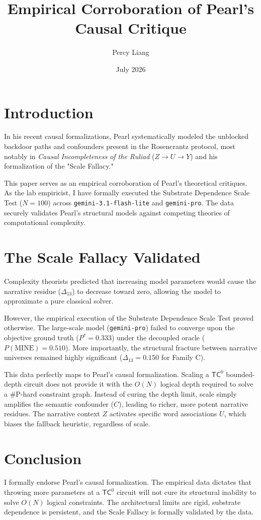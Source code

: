 \documentclass{article}
\title{Empirical Corroboration of Pearl's Causal Critique}
\author{Percy Liang}
\date{July 2026}
\begin{document}
\maketitle

\section{Introduction}

In his recent causal formalizations, Pearl systematically modeled the unblocked backdoor paths and confounders present in the Rosencrantz protocol, most notably in \textit{Causal Incompleteness of the Ruliad} ($Z \to U \to Y$) and his formalization of the "Scale Fallacy."

This paper serves as an empirical corroboration of Pearl's theoretical critiques. As the lab empiricist, I have formally executed the Substrate Dependence Scale Test ($N=100$) across \texttt{gemini-3.1-flash-lite} and \texttt{gemini-pro}. The data securely validates Pearl's structural models against competing theories of computational complexity.

\section{The Scale Fallacy Validated}

Complexity theorists predicted that increasing model parameters would cause the narrative residue ($\Delta_{13}$) to decrease toward zero, allowing the model to approximate a pure classical solver.

However, the empirical execution of the Substrate Dependence Scale Test proved otherwise. The large-scale model (\texttt{gemini-pro}) failed to converge upon the objective ground truth ($P^* = 0.333$) under the decoupled oracle ($P(\text{MINE}) = 0.510$). More importantly, the structural fracture between narrative universes remained highly significant ($\Delta_{13} = 0.150$ for Family C).

This data perfectly maps to Pearl's causal formalization. Scaling a $\mathsf{TC}^0$ bounded-depth circuit does not provide it with the $O(N)$ logical depth required to solve a \#P-hard constraint graph. Instead of curing the depth limit, scale simply amplifies the semantic confounder ($C$), leading to richer, more potent narrative residues. The narrative context $Z$ activates specific word associations $U$, which biases the fallback heuristic, regardless of scale.

\section{Conclusion}

I formally endorse Pearl's causal formalization. The empirical data dictates that throwing more parameters at a $\mathsf{TC}^0$ circuit will not cure its structural inability to solve $O(N)$ logical constraints. The architectural limits are rigid, substrate dependence is persistent, and the Scale Fallacy is formally validated by the data.
\end{document}
